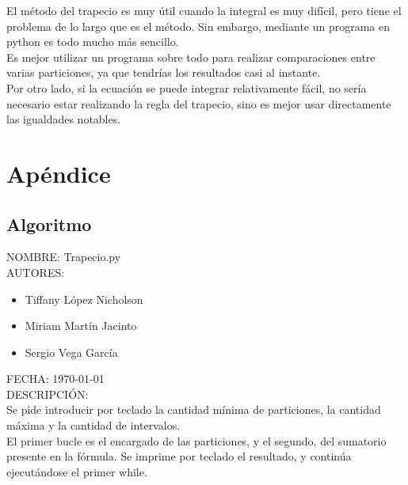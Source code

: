 \documentclass{article}
\begin{document}
    El método del trapecio es muy útil cuando la integral es muy difícil, pero tiene el problema de lo largo que es el método. Sin embargo, mediante un programa en python es todo mucho más sencillo.\\

    Es mejor utilizar un programa sobre todo para realizar comparaciones entre varias particiones, ya que tendrías los resultados casi al instante.\\

    Por otro lado, si la ecuación se puede integrar relativamente fácil, no sería necesario estar realizando la regla del trapecio, sino es mejor usar directamente las igualdades notables.\\

   \pagebreak

   \section{Apéndice}
    \subsection{Algoritmo}
   NOMBRE: Trapecio.py\\
   
   AUTORES:

   \begin{itemize}
     \item Tiffany López Nicholson
     \item Miriam Martín Jacinto
     \item Sergio Vega García
   \end{itemize}

   FECHA: \today \\

   DESCRIPCIÓN:\\

     Se pide introducir por teclado la cantidad mínima de particiones, la cantidad máxima y la cantidad de intervalos.\\

     El primer bucle es el encargado de las particiones, y el segundo, del sumatorio presente en la fórmula. Se imprime por teclado el resultado, y continúa ejecutándose el primer while.\\
   

\end{document}
